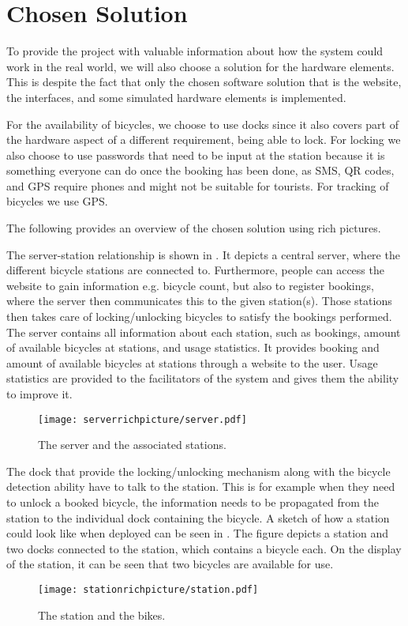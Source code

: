 \section{Chosen Solution}
To provide the project with valuable information about how the system could work in the real world, we will also choose a solution for the hardware elements.
This is despite the fact that only the chosen software solution that is the website, the interfaces, and some simulated hardware elements is implemented.

For the availability of bicycles, we choose to use docks since it also covers part of the hardware aspect of a different requirement, being able to lock.  
For locking we also choose to use passwords that need to be input at the station because it is something everyone can do once the booking has been done, as SMS, QR codes, and GPS require phones and might not be suitable for tourists.
For tracking of bicycles we use GPS.

The following provides an overview of the chosen solution using rich pictures.

The server-station relationship is shown in .
It depicts a central server, where the different bicycle stations are connected to.
Furthermore, people can access the website to gain information e.g. bicycle count, but also to register bookings, where the server then communicates this to the given station(s).
Those stations then takes care of locking/unlocking bicycles to satisfy the bookings performed.
The server contains all information about each station, such as bookings, amount of available bicycles at stations, and usage statistics.
It provides booking and amount of available bicycles at stations through a website to the user. 
Usage statistics are provided to the facilitators of the system and gives them the ability to improve it. 

\begin{figure}[h]
\centering
\texttt{[image: serverrichpicture/server.pdf]}
\caption{The server and the associated stations.}
\label{fig:ServerRichPicture}
\end{figure}

The dock that provide the locking/unlocking mechanism along with the bicycle detection ability have to talk to the station. 
This is for example when they need to unlock a booked bicycle, the information needs to be propagated from the station to the individual dock containing the bicycle.
A sketch of how a station could look like when deployed can be seen in .
The figure depicts a station and two docks connected to the station, which contains a bicycle each. 
On the display of the station, it can be seen that two bicycles are available for use.
\begin{figure}[h]
\centering
\texttt{[image: stationrichpicture/station.pdf]}
\caption{The station and the bikes.}
\label{fig:StationRichPicture}
\end{figure}